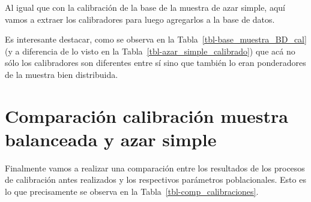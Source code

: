 \documentclass[
  spanish,
  a4paper,
]{scrreprt}
\begin{document}
Al igual que con la calibración de la base de la muestra de azar simple,
aquí vamos a extraer los calibradores para luego agregarlos a la base de
datos.

Es interesante destacar, como se observa en la
Tabla~\ref{tbl-base_muestra_BD_cal} (y a diferencia de lo visto en la
Tabla~\ref{tbl-azar_simple_calibrado}) que acá no sólo los calibradores
son diferentes entre sí sino que también lo eran ponderadores de la
muestra bien distribuida.

\begin{table}

\caption{\label{tbl-base_muestra_BD_cal}Ponderadores y calibradores.
Base muestra bien distribuida.}


\end{table}%

\section{Comparación calibración muestra balanceada y azar
simple}\label{comparaciuxf3n-calibraciuxf3n-muestra-balanceada-y-azar-simple}

Finalmente vamos a realizar una comparación entre los resultados de los
procesos de calibración antes realizados y los respectivos parámetros
poblacionales. Esto es lo que precisamente se observa en la
Tabla~\ref{tbl-comp_calibraciones}.
\end{document}
